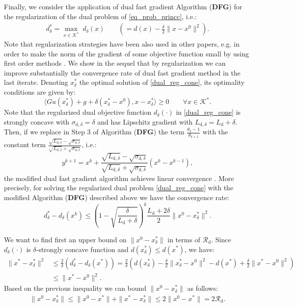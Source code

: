 \documentclass{gOMS2e}
\theoremstyle{plain}
\theoremstyle{definition}
\theoremstyle{remark}
\begin{document}
\noindent Finally, we consider the application of dual fast
gradient Algorithm (\textbf{DFG}) for the regularization of the dual
problem of \eqref{eq_prob_princc}, i.e.:
\begin{align} \label{dual_reg_cone}
d_\delta^* = \max_{x \in {\mathcal{K}}^*} \; d_\delta(x)  \qquad \left( = d(x)
- \frac{\delta}{2} \|x - x^0\|^2 \right).
\end{align}
Note that regularization strategies have been also used  in other
papers, e.g. in order to make the norm of the gradient of some
objective function small by using first order methods
\cite{Nes:12,LanMon:08}. We show in the sequel that by
regularization  we can improve substantially the convergence rate of
dual fast gradient method  in the last iterate.   Denoting
$x^*_\delta$ the optimal solution of \eqref{dual_reg_cone}, its
optimality conditions are given by:
\begin{equation}\label{optcond_regdelta}
 \langle Gu(x^*_{\delta}) + g + \delta (x^*_{\delta}  - x^0), x  - x^*_{\delta}\rangle
 \ge 0 \qquad \forall x \in \mathcal{K}^*.
\end{equation}
Note that the regularized dual objective function $d_\delta (\cdot)$
in \eqref{dual_reg_cone} is strongly concave with
$\sigma_{\text{d},\delta}=\delta$ and has Lipschitz gradient with
$L_{\text{d},\delta} = L_\text{d} + \delta$. Then, if we replace in
Step 3 of Algorithm (\textbf{DFG}) the term $\frac{\theta_k -
1}{\theta_{k+1}}$ with the constant term $
\frac{\sqrt{L_{\text{d},\delta}} -
\sqrt{\sigma_{\text{d},\delta}}}{\sqrt{L_{\text{d},\delta}} +
\sqrt{\sigma_{\text{d},\delta}}}$, i.e.:
\[  y^{k+1} = x^k  + \frac{\sqrt{L_{\text{d},\delta}} -
\sqrt{\sigma_{\text{d},\delta}}}{\sqrt{L_{\text{d},\delta}} +
\sqrt{\sigma_{\text{d},\delta}}} \left( x^k - x^{k-1} \right),  \]
the modified dual fast gradient algorithm achieves linear
convergence \cite{Nes:04}. More precisely,  for solving  the
regularized dual problem \eqref{dual_reg_cone}  with the modified
Algorithm (\textbf{DFG}) described above we have the convergence
rate:
\[  d_\delta^* - d_\delta(x^k) \leq  \left( 1 - \sqrt{\frac{\delta}{L_\text{d} +
\delta}} \right)^k \frac{L_\text{d} + 2 \delta}{2} \| x^0 -
x^*_\delta \|^2.  \]

\noindent We want to find first an upper bound on $\| x^0 -
x^*_\delta \|$ in terms of  $\mathcal{R}_{\text{d}}$. Since
$d_\delta (\cdot)$ is $\delta$-strongly concave function and
$d(x^*_\delta) \leq d(x^*)$, we have:
\begin{align*}
\|x^* - x^*_\delta \|^2 & \leq \frac{2}{\delta} (d_\delta^* -
d_\delta (x^*)) = \frac{2}{\delta} \left( d(x^*_\delta)  - \frac{\delta}{2} \|x^*_\delta - x^0\|^2 - d(x^*) + \frac{\delta}{2} \|x^* - x^0\|^2 \right) \\
& \leq \| x^* - x^0\|^2.
\end{align*}
Based on the previous inequality we can bound  $\| x^0 - x^*_\delta
\|$ as follows:
\begin{align*}
\| x^0 - x^*_\delta \| \leq \|x^0 - x^*\| + \|x^* - x^*_\delta \|
\leq 2 \|x^0 - x^* \| = 2 \mathcal{R}_{\text{d}}.
\end{align*}
\end{document}
